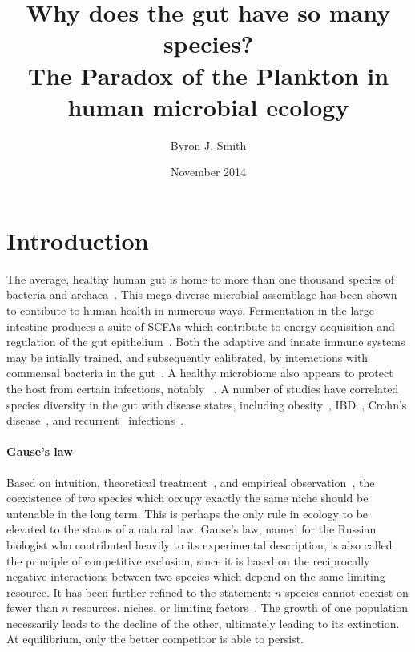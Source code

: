 \documentclass[12pt]{article}
\begin{document}
\title{\huge Why does the gut have so many species? \\
       {\Large The Paradox of the Plankton in human microbial ecology}}
\author{Byron J. Smith}
\date{November 2014}
\maketitle

\section{Introduction}
The average, healthy human gut is home to more than one thousand species of
bacteria and archaea~\citep{Claesson2009,Brestoff2013}.
This mega-diverse microbial assemblage has been shown to contibute to human
health in numerous ways.
Fermentation in the large intestine produces a suite of \glspl*{SCFA}
which contribute to energy acquisition and regulation of
the gut epithelium~\citep{TODO}.
Both the adaptive and innate immune systems may be intially trained,
and subsequently calibrated,
by interactions with commensal bacteria in the gut~\citep{TODO}.
A healthy microbiome also appears to protect the host from certain
infections, notably \cdiff~\citep{TODO}.
A number of studies have correlated species diversity in the gut
with disease states,
including obesity~\citep{TODO},
\gls*{IBD}~\citep{TODO},
Crohn's disease~\citep{Manichanh2006},
and recurrent \cdiff\ infections~\citep{Chang2008}.

\paragraph{Gause's law}
Based on intuition, theoretical
treatment~\citep{Lotka1925,Volterra1928,MacArthur1967a},
and empirical observation~\citep{Gause1932,Gause1936},
the coexistence of two species which occupy
exactly the same niche should be untenable in the long term.
This is perhaps the only rule in ecology to be elevated to the
status of a natural law.
Gause's law, named for the Russian biologist who contributed
heavily to its experimental description, is also called
the principle of competitive exclusion, since it is based on
the reciprocally negative interactions between two species which
depend on the same limiting resource.
It has been further refined to the statement: \(n\) species cannot coexist on
fewer than \(n\) resources, niches, or limiting
factors~\citep[various authors, for a review see][]{Armstrong1980}.
The growth of one population necessarily leads to the decline of
the other, ultimately leading to its extinction.
At equilibrium, only the better competitor is able to persist.
\end{document}
